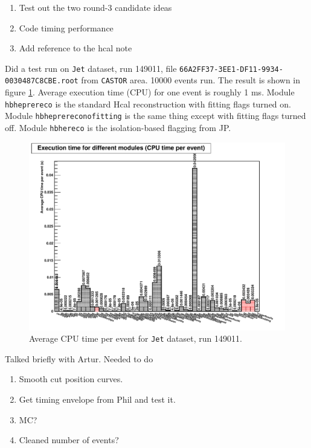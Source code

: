 

\begin{enumerate}
\item Test out the two round-3 candidate ideas
\item Code timing performance
\item Add reference to the hcal note
\end{enumerate}


Did a test run on \texttt{Jet} dataset, run 149011, file \texttt{66A2FF37-3EE1-DF11-9934-0030487C8CBE.root} from \texttt{CASTOR} area.
10000 events run.  The result is shown in figure \ref{Figure_6363_JetDataset10000EventExecutionTime}.
Average execution time (CPU) for one event is roughly 1 ms.  Module \texttt{hbheprereco} is the standard Hcal reconstruction with fitting flags turned on.
Module \texttt{hbheprereconofitting} is the same thing except with fitting flags turned off.
Module \texttt{hbhereco} is the isolation-based flagging from JP.

\begin{figure}
   \includegraphics[width=120mm]{DailyLog/6363/6363_ExecutionTime.pdf}
   \caption{Average CPU time per event for \texttt{Jet} dataset, run 149011.}
   \label{Figure_6363_JetDataset10000EventExecutionTime}
\end{figure}


Talked briefly with Artur.  Needed to do

\begin{enumerate}
\item Smooth cut position curves.
\item Get timing envelope from Phil and test it.
\item MC?
\item Cleaned number of events?
\end{enumerate}


